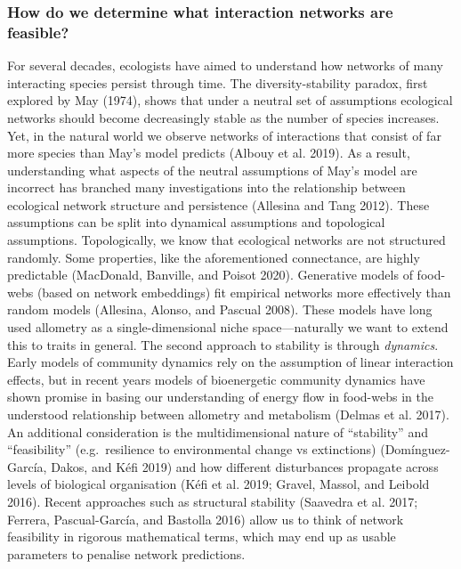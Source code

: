 \documentclass[10pt,oneside]{article}
\begin{document}
\hypertarget{how-do-we-determine-what-interaction-networks-are-feasible}{%
\subsubsection{How do we determine what interaction networks are
feasible?}\label{how-do-we-determine-what-interaction-networks-are-feasible}}

For several decades, ecologists have aimed to understand how networks of
many interacting species persist through time. The diversity-stability
paradox, first explored by May (1974), shows that under a neutral set of
assumptions ecological networks should become decreasingly stable as the
number of species increases. Yet, in the natural world we observe
networks of interactions that consist of far more species than May's
model predicts (Albouy et al. 2019). As a result, understanding what
aspects of the neutral assumptions of May's model are incorrect has
branched many investigations into the relationship between ecological
network structure and persistence (Allesina and Tang 2012). These
assumptions can be split into dynamical assumptions and topological
assumptions. Topologically, we know that ecological networks are not
structured randomly. Some properties, like the aforementioned
connectance, are highly predictable (MacDonald, Banville, and Poisot
2020). Generative models of food-webs (based on network embeddings) fit
empirical networks more effectively than random models (Allesina,
Alonso, and Pascual 2008). These models have long used allometry as a
single-dimensional niche space---naturally we want to extend this to
traits in general. The second approach to stability is through
\emph{dynamics}. Early models of community dynamics rely on the
assumption of linear interaction effects, but in recent years models of
bioenergetic community dynamics have shown promise in basing our
understanding of energy flow in food-webs in the understood relationship
between allometry and metabolism (Delmas et al. 2017). An additional
consideration is the multidimensional nature of ``stability'' and
``feasibility'' (e.g.~resilience to environmental change vs extinctions)
(Domínguez-García, Dakos, and Kéfi 2019) and how different disturbances
propagate across levels of biological organisation (Kéfi et al. 2019;
Gravel, Massol, and Leibold 2016). Recent approaches such as structural
stability (Saavedra et al. 2017; Ferrera, Pascual-García, and Bastolla
2016) allow us to think of network feasibility in rigorous mathematical
terms, which may end up as usable parameters to penalise network
predictions.
\end{document}
